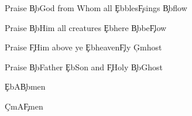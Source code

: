 \documentclass[9pt]{extarticle}
\begin{document}
\bsong

\bc
Praise \c{Bb}God from Whom all \c{Eb}bles\c{F}sings \c{Bb}flow

Praise \c{Bb}Him all creatures \c{Eb}here \c{Bb}be\c{F}low

Praise \c{F}Him above ye \c{Eb}heaven\c{F}ly \c{Gm}host

Praise \c{Bb}Father \c{Eb}Son and \c{F}Holy \c{Bb}Ghost
\ec

\bb
\c{Eb}A\c{Bb}men
\eb

\bb
\c{Cm}A\c{F}men
\eb

\esong
\end{document}
